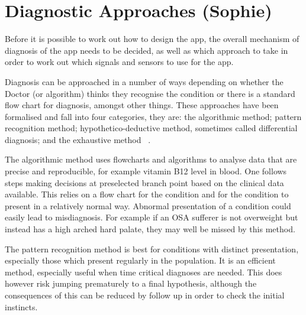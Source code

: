 \section{Diagnostic Approaches (Sophie)}
\label{sec:diagnosticMethods-sophie}
Before it is possible to work out how to design the app, the overall mechanism of diagnosis of the app needs to be decided, as well as which approach to take in order to work out which signals and sensors to use for the app.

Diagnosis can be approached in a number of ways depending on whether the Doctor (or algorithm) thinks they recognise the condition or there is a standard flow chart for diagnosis, amongst other things. These approaches have been formalised and fall into four categories, they are: the algorithmic method; pattern recognition method; hypothetico-deductive method, sometimes called differential diagnosis; and the exhaustive method ~\cite{ebpdiagnosticstrategies,mengel2002fundamentals}.

The algorithmic method uses flowcharts and algorithms to analyse data that are precise and reproducible, for example vitamin B12 level in blood. One follows steps making decisions at preselected branch point based on the clinical data available. This relies on a flow chart for the condition and for the condition to present in a relatively normal way. Abnormal presentation of a condition could easily lead to misdiagnosis. For example if an OSA sufferer is not overweight but instead has a high arched hard palate, they may well be missed by this method. 

The pattern recognition method is best for conditions with distinct presentation, especially those which present regularly in the population. It is an efficient method, especially useful when time critical diagnoses are needed. This does however risk jumping prematurely to a final hypothesis, although the consequences of this can be reduced by follow up in order to check the initial instincts. 

